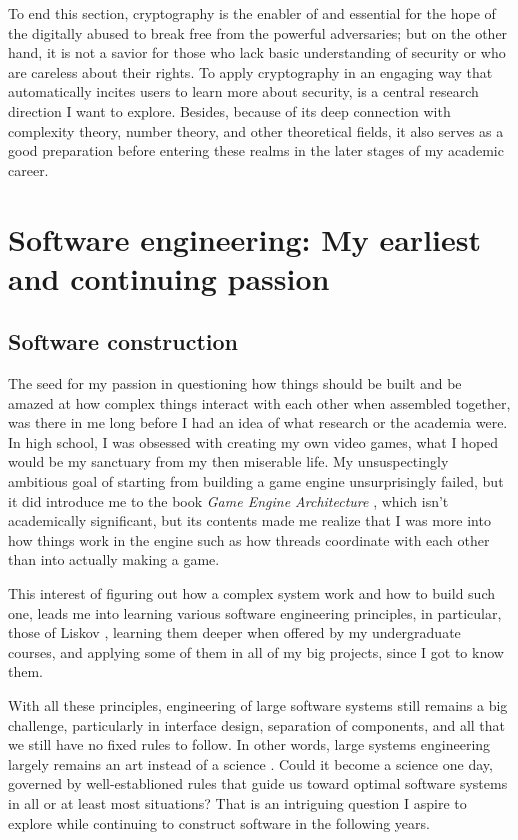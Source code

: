 \documentclass[10pt]{article}
\begin{document}
To end this section, cryptography is the enabler of and essential for the hope
of the digitally abused to break free from the powerful adversaries; but on the
other hand, it is not a savior for those who lack basic understanding of
security or who are careless about their rights. To apply cryptography in an
engaging way that automatically incites users to learn more about security, is
a central research direction I want to explore. Besides, because of its deep
connection with complexity theory, number theory, and other theoretical fields,
it also serves as a good preparation before entering these realms in the later
stages of my academic career.

\section[Software engineering]{
Software engineering: My earliest and continuing passion}
\subsection{Software construction}
The seed for my passion in questioning how things should be built and be amazed
at how complex things interact with each other when assembled together, was
there in me long before I had an idea of what research or the academia were. In
high school, I was obsessed with creating my own video games, what I hoped
would be my sanctuary from my then miserable life. My unsuspectingly ambitious
goal of starting from building a game engine unsurprisingly failed, but it did
introduce me to the book \emph{Game Engine Architecture}
\cite{game.engine.arch}, which isn't academically significant, but its contents
made me realize that I was more into how things work in the engine such as how
threads coordinate with each other than into actually making a game.

This interest of figuring out how a complex system work and how to build such
one, leads me into learning various software engineering principles, in
particular, those of Liskov \cite{liskov.adt, liskov.subtype}, learning them
deeper when offered by my undergraduate courses, and applying some of them in
all of my big projects, since I got to know them. 

With all these principles, engineering of large software systems still remains
a big challenge, particularly in interface design, separation of components,
and all that we still have no fixed rules to follow. In other words, large
systems engineering largely remains an art instead of a science
\cite{no.silver.bullet, prospect.eng.discipline.software}. Could it become a
science one day, governed by well-establioned rules that guide us toward
optimal software systems in all or at least most situations? That is an
intriguing question I aspire to explore while continuing to construct software
in the following years.
\end{document}
